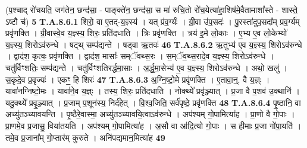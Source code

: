 \documentclass[17pt]{extarticle}
\begin{document}
                  \newline
                                                        (प॒श्चाद् रो॑चयति॒ जग॑तेन॒ छन्द॑सा॒ - पाङ्क्ते॑न॒ छन्द॑सा॒ स मा॑ रुचि॒तो रो॑च॒येत्या॑हा॒शिष॑मे॒वैतामाशा᳚स्ते - शास्ते॒ ऽष्टौ च॑) \textbf{5} \newline \newline
                                \textbf{ T.A.8.6.1} \newline
                  शिरो॒ वा ए॒तद्-य॒ज्ञ्स्य॑ । यत् प्र॑व॒र्ग्यः॑ । ग्री॒वा उ॑प॒सदः॑ । पु॒रस्ता॑दुप॒सदा᳚म् प्रव॒र्ग्य॑म् प्रवृ॑णक्ति । ग्री॒वास्वे॒व य॒ज्ञ्स्य॒ शिरः॒ प्रति॑दधाति । त्रिः प्रवृ॑णक्ति । त्रय॑ इ॒मे लो॒काः । ए॒भ्य ए॒व लो॒केभ्यो॑ य॒ज्ञ्स्य॒ शिरोऽव॑रुन्धे ।  षट्थ् सम्प॑द्यन्ते । षड्वा ऋ॒तवः॑ \textbf{ 46} \newline
                  \newline
                                                                  \textbf{ T.A.8.6.2} \newline
                  ऋ॒तुभ्य॑ ए॒व य॒ज्ञ्स्य॒ शिरोऽव॑रुन्धे । द्वाद॑श॒ कृत्वः॒ प्रवृ॑णक्ति । द्वाद॑श॒ मासाः᳚ सम्ॅवथ्स॒रः । स॒म्ॅव॒थ्स॒रादे॒व य॒ज्ञ्स्य॒ शिरोऽव॑रुन्धे । चतु॑र्विꣳशतिः॒ सम्प॑द्यन्ते । चतु॑र्विꣳशतिरर्द्धमा॒साः ।  अ॒र्द्ध॒मा॒सेभ्य॑ ए॒व य॒ज्ञ्स्य॒ शिरोऽव॑रुन्धे । अथो॒ खलु॑ । स॒कृदे॒व प्र॒वृज्यः॑ । एकꣳ॒॒ हि शिरः॑ \textbf{ 47} \newline
                  \newline
                                                                  \textbf{ T.A.8.6.3} \newline
                  अ॒ग्नि॒ष्टो॒मे प्रवृ॑णक्ति । ए॒तावा॒न्॒. वै य॒ज्ञ्ः । यावा॑नग्निष्टो॒मः । यावा॑ने॒व य॒ज्ञ्ः । तस्य॒ शिरः॒ प्रति॑दधाति । नोक्थ्ये᳚ प्रवृ॑ञ्ज्यात् ।  प्र॒जा वै प॒शव॑ उ॒क्थानि॑ । यदु॒क्थ्ये᳚ प्रवृ॒ञ्ज्यात् ।  प्र॒जाम् प॒शून॑स्य॒ निर्द॑हेत् । वि॒श्व॒जिति॒ सर्व॑पृष्ठे॒ प्रवृ॑णक्ति \textbf{ 48} \newline
                  \newline
                                                                  \textbf{ T.A.8.6.4} \newline
                  पृ॒ष्ठानि॒ वा अच्यु॑तञ्च्यावयन्ति ।  पृ॒ष्ठैरे॒वास्मा॒ अच्यु॑तञ्च्यावयि॒त्वाऽव॑रुन्धे । अप॑श्यम् गो॒पामित्या॑ह । प्रा॒णो वै गो॒पाः । प्रा॒णमे॒व प्र॒जासु॒ विया॑तयति ।  अप॑श्यम् गो॒पामित्या॑ह । अ॒सौ वा आ॑दि॒त्यो गो॒पाः । स हीमाः प्र॒जा गो॑पा॒यति॑ । तमे॒व प्र॒जाना᳚म् गो॒प्तार॑म् कुरुते । अनि॑पद्यमान॒मित्या॑ह \textbf{ 49} \newline
                  \newline
\end{document}
